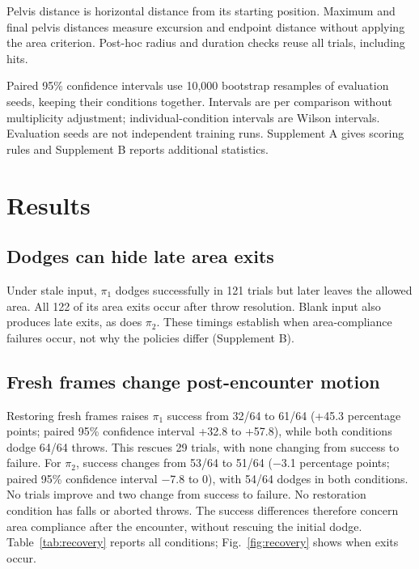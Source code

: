\documentclass[conference]{IEEEtran}
\begin{document}
Pelvis distance is horizontal distance from its starting position. Maximum and
final pelvis distances measure excursion and endpoint distance without applying
the area criterion. Post-hoc radius and duration checks reuse all trials,
including hits.

Paired 95\% confidence intervals use 10,000 bootstrap resamples of evaluation
seeds, keeping their conditions together. Intervals are per comparison without
multiplicity adjustment; individual-condition intervals are Wilson intervals.
Evaluation seeds are not independent training runs. Supplement A gives scoring
rules and Supplement B reports additional statistics.



\begin{table}[!t]
\begin{minipage}[t]{.48\textwidth}
\caption{Original restoration experiment. Counts out of 64 per condition; falls and aborted throws are zero.}
\label{tab:recovery}\centering\footnotesize

\end{minipage}\hfill
\begin{minipage}[t]{.48\textwidth}
\caption{Input-handling experiment. Counts out of 192 per condition. Success requires a dodge, no fall, and area compliance.}
\label{tab:policies}\centering\footnotesize

\end{minipage}
\end{table}

\section{Results}
\subsection{Dodges can hide late area exits}
Under stale input, $\pi_1$ dodges successfully in 121 trials but later leaves the
allowed area. All 122 of its area exits occur after throw resolution. Blank
input also produces late exits, as does $\pi_2$. These timings establish when
area-compliance failures occur, not why the policies differ (Supplement B).

\subsection{Fresh frames change post-encounter motion}
Restoring fresh frames raises $\pi_1$ success from 32/64 to 61/64
(+45.3 percentage points; paired 95\% confidence interval +32.8 to +57.8), while
both conditions dodge 64/64 throws. This rescues 29 trials, with none changing
from success to failure. For $\pi_2$, success changes from 53/64 to 51/64
($-$3.1 percentage points; paired 95\% confidence interval $-$7.8 to 0), with
54/64 dodges in both conditions. No trials improve and two change from success
to failure. No restoration condition has falls or aborted throws. The success differences therefore concern area compliance
after the encounter, without rescuing the initial dodge. Table~\ref{tab:recovery}
reports all conditions; Fig.~\ref{fig:recovery} shows when exits occur.
\end{document}
